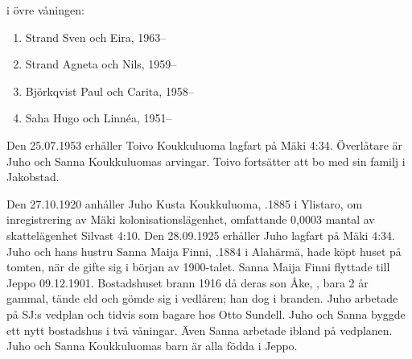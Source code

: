  i övre våningen:
\begin{enumerate}
  \item Strand Sven och Eira,	1963--
  \item Strand Agneta och Nils, 1959--
  \item Björkqvist Paul och Carita, 1958--
  \item Saha Hugo och Linnéa,	1951--
\end{enumerate}


Den 25.07.1953 erhåller Toivo Koukkuluoma lagfart på Mäki 4:34.	Överlåtare är Juho och Sanna Koukkuluomas arvingar. Toivo fortsätter att bo med sin familj i Jakobstad.


Den 27.10.1920 anhåller Juho Kusta Koukkuluoma, .1885 i Ylistaro, om inregistrering av Mäki kolonisationslägenhet, omfattande 0,0003 mantal av skattelägenhet Silvast 4:10. Den 28.09.1925 erhåller Juho lagfart på Mäki 4:34. Juho och hans hustru Sanna Maija Finni, .1884 i Alahärmä, hade köpt huset på tomten, när de gifte sig i början av 1900-talet. Sanna Maija Finni flyttade till Jeppo 09.12.1901.	Bostadshuset brann 1916 då deras son Åke, , bara 2 år gammal, tände eld och 	gömde sig i vedlåren; han dog i branden. Juho arbetade på SJ:s vedplan och tidvis som bagare hos Otto Sundell. Juho och Sanna byggde	ett nytt bostadshus i två våningar. Även Sanna arbetade ibland på 	vedplanen. Juho och Sanna Koukkuluomas barn är alla födda i Jeppo.
\begin{jhchildren}
  \item {}
  \item {}
  \item {}
  \item {}
  \item {}
  \item {}
  \item {}
  \item {}
  \item {}
  \item {}
\end{jhchildren}

